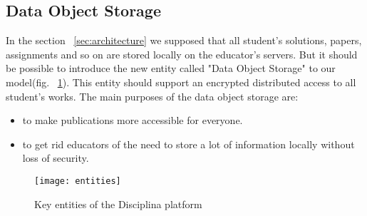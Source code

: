 \subsection{Data Object Storage}
\label{apx:data-object-storage}

In the section ~\ref{sec:architecture} we supposed that all student's solutions, papers, assignments and so on are stored locally on the educator's servers. But it should be possible to introduce the new entity called "Data Object Storage" to our model(fig. ~\ref{fig:entities}). This entity should support an encrypted distributed access to all student's works. The main purposes of the data object storage are:
\begin{itemize}
\item to make publications more accessible for everyone.
\item to get rid educators of the need to store a lot of information locally without loss of security.
\end{itemize}

\begin{figure}[ht]
\centering
\texttt{[image: entities]}
\caption{Key entities of the Disciplina platform}
\label{fig:entities}
\end{figure}
